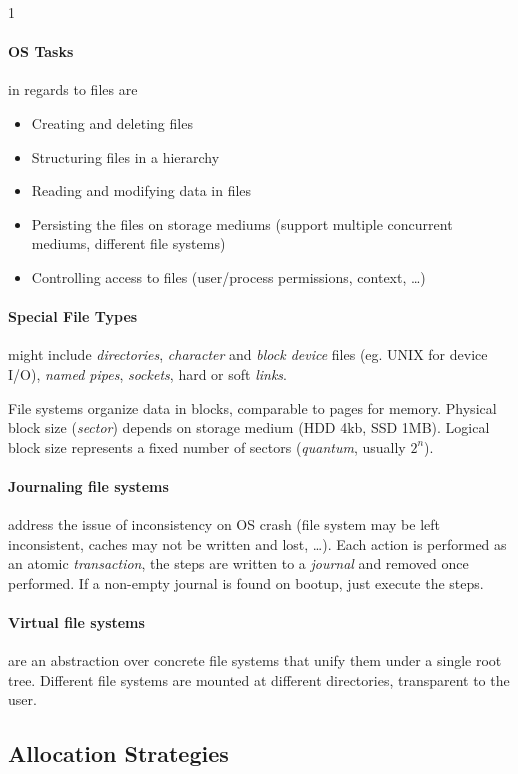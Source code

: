 \documentclass{article}
\begin{document}
\begin{multicols}{1}
\paragraph{OS Tasks} in regards to files are
\begin{itemize}
    \item Creating and deleting files
    \item Structuring files in a hierarchy
    \item Reading and modifying data in files
    \item Persisting the files on storage mediums (support multiple concurrent mediums, different file systems)
    \item Controlling access to files (user/process permissions, context, \ldots)
\end{itemize}

\paragraph{Special File Types} might include \emph{directories}, \emph{character} and \emph{block device} files (eg. UNIX for device I/O), \emph{named pipes}, \emph{sockets}, hard or soft \emph{links}.

File systems organize data in blocks, comparable to pages for memory. Physical block size (\emph{sector}) depends on storage medium (HDD 4kb, SSD 1MB). Logical block size represents a fixed number of sectors (\emph{quantum}, usually $2^n$).

\paragraph{Journaling file systems} address the issue of inconsistency on OS crash (file system may be left inconsistent, caches may not be written and lost, \ldots). Each action is performed as an atomic \emph{transaction}, the steps are written to a \emph{journal} and removed once performed. If a non-empty journal is found on bootup, just execute the steps.

\paragraph{Virtual file systems} are an abstraction over concrete file systems that unify them under a single root tree. Different file systems are mounted at different directories, transparent to the user. 

\subsection*{Allocation Strategies}


\end{multicols}
\end{document}
